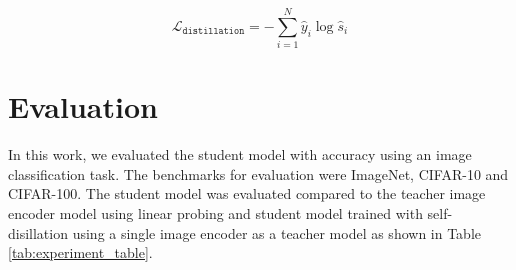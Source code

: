 \begin{equation}
    \label{eq:loss_self_dist}
    \mathcal{L}_{\texttt{distillation}} = -\sum_{i=1}^{N} \hat{y}_i\log\hat{s}_i
\end{equation}



\section{Evaluation}
In this work, we evaluated the student model with accuracy using an image classification task.
The benchmarks for evaluation were ImageNet, CIFAR-10 and CIFAR-100.
The student model was evaluated compared to the teacher image encoder model using linear probing and student model trained with self-disillation using a single image encoder as a teacher model as shown in Table \ref{tab:experiment_table}.

